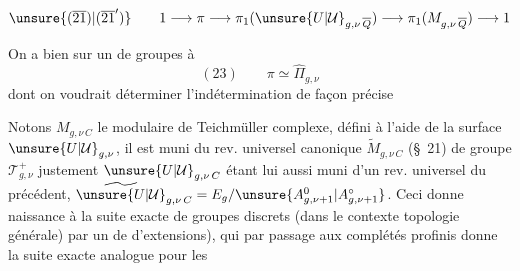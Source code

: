

\[
\unsure{(\overline{21})|(\overline{21}')}\qquad
1\longrightarrow\pi\longrightarrow\pi_1(\unsure{U|\mathcal{U}}_{g,\nu\,\overline{Q}})
\longrightarrow\pi_1(M_{g,\nu\,\overline{Q}})\longrightarrow1
\]

On a bien sur un  de groupes à 
\[
(23)\qquad \pi\simeq\widehat{\Pi}_{g,\nu}
\]
dont on voudrait déterminer l'indétermination de façon précise

Notons $M_{g,\nu\,C}$ le  modulaire de Teichmüller complexe, défini à l'aide de la surface  $\unsure{U|\mathcal{U}}_{g,\nu}$, il est muni du rev. universel canonique $\widetilde{M}_{g,\nu\,C}$ (\S~21)
de groupe  $\mathcal{T}_{g,\nu}^{+}$ justement 
$\unsure{U|\mathcal{U}}_{g,\nu\,C}$ étant lui aussi muni d'un rev. universel  du précédent,
$\widetilde{\unsure{U|\mathcal{U}}}_{g,\nu\,C}=E_g/\unsure{A_{g,\nu+1}^{0}|A_{g,\nu+1}^{\circ}}$.
Ceci donne naissance à la suite exacte de groupes discrets (dans le contexte topologie générale)
par un  de  d'extensions), qui par passage aux complétés profinis donne la suite exacte analogue pour les


